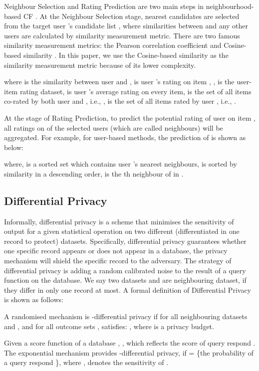 \documentclass[11pt]{article}
\begin{document}
Neighbour Selection and Rating Prediction are two main steps in neighbourhood-based CF \cite{ZHU2014}. At the Neighbour Selection stage,  nearest candidates are selected from the target user 's candidate list , where similarities between  and any other users are calculated by similarity measurement metric. There are two famous similarity measurement metrics: the Pearson correlation coefficient and Cosine-based similarity \cite{ADOMAVICIUS2005}. In this paper, we use the Cosine-based similarity \cite{RAJARAMAN2011} as the similarity measurement metric because of its lower complexity.

where  is the similarity between user  and ,  is user 's rating on item , ,  is the user-item rating dataset,  is user 's average rating on every item,  is the set of all items co-rated by both user  and , i.e., ,  is the set of all items rated by user , i.e., .

At the stage of Rating Prediction, to predict the potential rating  of user  on item , all ratings on  of the  selected users (which are called neighbours) will be aggregated. For example, for user-based methods, the prediction of  is shown as below:

where,  is a sorted set which contains user 's  nearest neighbours,  is sorted by similarity in a descending order,  is the th neighbour of  in .

\subsection{Differential Privacy}
Informally, differential privacy \cite{DWORK2006} is a scheme that minimises the sensitivity of output for a given statistical operation on two different (differentiated in one record to protect) datasets. Specifically, differential privacy guarantees whether one specific record appears or does not appear in a database, the privacy mechanism will shield the specific record to the adversary. The strategy of differential privacy is adding a random calibrated noise to the result of a query function on the database. We say two datasets  and  are neighbouring dataset, if they differ in only one record at most. A formal definition of Differential Privacy is shown as follows:
\begin{definition}
A randomised mechanism  is -differential privacy if for all neighbouring datasets  and , and for all outcome sets ,  satisfies: , where  is a privacy budget. 
\end{definition}
\begin{definition}
Given a score function of a database , , which reflects the score of query respond . The exponential mechanism  provides -differential privacy, if  = \{the probability of a query respond   \}, where , denotes the sensitivity of .
\end{definition}
\end{document}
